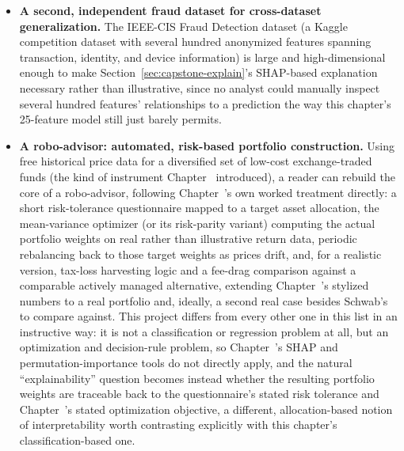 \documentclass[../ai_in_finance]{subfiles}
\begin{document}
\begin{itemize}
    \item \textbf{A second, independent fraud dataset for cross-dataset generalization.} The IEEE-CIS Fraud Detection dataset (a Kaggle competition dataset with several hundred anonymized features spanning transaction, identity, and device information) is large and high-dimensional enough to make Section~\ref{sec:capstone-explain}'s SHAP-based explanation necessary rather than illustrative, since no analyst could manually inspect several hundred features' relationships to a prediction the way this chapter's 25-feature model still just barely permits.
    \item \textbf{A robo-advisor: automated, risk-based portfolio construction.} Using free historical price data for a diversified set of low-cost exchange-traded funds (the kind of instrument Chapter~ introduced), a reader can rebuild the core of a robo-advisor, following Chapter~'s own worked treatment directly: a short risk-tolerance questionnaire mapped to a target asset allocation, the mean-variance optimizer (or its risk-parity variant) computing the actual portfolio weights on real rather than illustrative return data, periodic rebalancing back to those target weights as prices drift, and, for a realistic version, tax-loss harvesting logic and a fee-drag comparison against a comparable actively managed alternative, extending Chapter~'s stylized numbers to a real portfolio and, ideally, a second real case besides Schwab's to compare against. This project differs from every other one in this list in an instructive way: it is not a classification or regression problem at all, but an optimization and decision-rule problem, so Chapter~'s SHAP and permutation-importance tools do not directly apply, and the natural ``explainability'' question becomes instead whether the resulting portfolio weights are traceable back to the questionnaire's stated risk tolerance and Chapter~'s stated optimization objective, a different, allocation-based notion of interpretability worth contrasting explicitly with this chapter's classification-based one.

\end{itemize}
\end{document}

